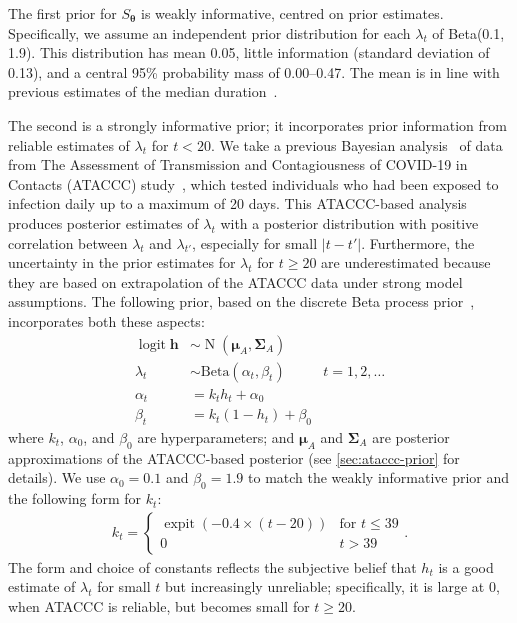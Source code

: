 \documentclass[12pt]{article}
\def\dist{\sim}
\DeclareMathOperator{\logit}{logit}
\DeclareMathOperator{\MNorm}{N}
\DeclareMathOperator{\expit}{expit}
\newcommand\matr{\bm}
\renewcommand{\vec}[1]{\bm{#1}}
\begin{document}
The first prior for $S_{\vec{\theta}}$ is weakly informative, centred on prior estimates.
Specifically, we assume an independent prior distribution for each $\lambda_t$ of Beta(0.1, 1.9).
This distribution has mean 0.05, little information (standard deviation of 0.13), and a central 95\% probability mass of 0.00--0.47.
The mean is in line with previous estimates of the median duration~\citep{cevikShedding}.

The second is a strongly informative prior; it incorporates prior information from reliable estimates of $\lambda_t$ for $t < 20$.
We take a previous Bayesian analysis~\citep{blakeThesis} of data from The Assessment of Transmission and Contagiousness of COVID-19 in Contacts (ATACCC) study~\citep{hakkiOnset}, which tested individuals who had been exposed to infection daily up to a maximum of 20 days.
This ATACCC-based analysis produces posterior estimates of $\lambda_t$ with a posterior distribution with positive correlation between $\lambda_t$ and $\lambda_{t'}$, especially for small $|t-t'|$.
Furthermore, the uncertainty in the prior estimates for $\lambda_t$ for $t\geq20$ are underestimated because they are based on extrapolation of the ATACCC data under strong model assumptions.
The following prior, based on the discrete Beta process prior~\citep{ibrahimBayesian,sunStatisticala}, incorporates both these aspects:
\begin{align}
  \logit \vec{h} &\dist \MNorm(\vec{\mu}_A, \matr{\Sigma}_A) \\
  \lambda_t &\dist \text{Beta}(\alpha_t, \beta_t) &t = 1, 2, \dots \\
  \alpha_t &= k_t h_t + \alpha_0 \\
  \beta_t &= k_t (1 - h_t) + \beta_0
\end{align}
where $k_t$, $\alpha_0$, and $\beta_0$ are hyperparameters; and $\vec{\mu}_A$ and $\matr{\Sigma}_A$ are posterior approximations of the ATACCC-based posterior (see \cref{sec:ataccc-prior} for details).
We use $\alpha_0 = 0.1$ and $\beta_0 = 1.9$ to match the weakly informative prior and the following form for $k_t$:
\begin{align}
k_t = \begin{cases}
  \expit(-0.4 \times (t - 20)) &\text{for $t \leq 39$} \\
  0 &t > 39
\end{cases}.
\end{align}
The form and choice of constants reflects the subjective belief that $h_t$ is a good estimate of $\lambda_t$ for small $t$ but increasingly unreliable; specifically, it is large at 0, when ATACCC is reliable, but becomes small for $t \geq 20$.
\end{document}
